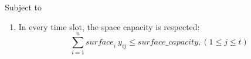 \documentclass{article}
\begin{document}
Subject to
\begin{enumerate}
    \item In every time slot, the space capacity is respected:
    \begin{equation}
        \sum^n_{i=1}\mathit{surface}_i \: y_{ij} \leq \mathit{surface\_capacity}, (1 \leq j \leq t)
    \end{equation}

\end{enumerate}
\end{document}
